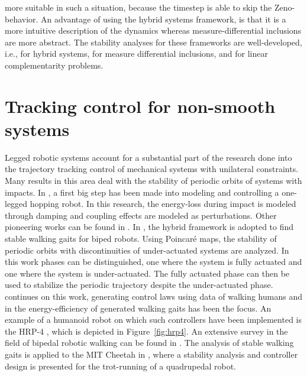 \documentclass[../DC2017114Bouma.tex]{subfiles}
\begin{document}
more suitable in such a situation, because the timestep is able to skip the Zeno-behavior. An advantage of using the hybrid systems framework, is that it is a more intuitive description of the dynamics whereas measure-differential inclusions are more abstract. The stability analyses for these frameworks are well-developed, i.e., \cite{Ye1998,Lygeros2003,Goebel2009} for hybrid systems, \cite{Pereira2004,Brogliato2004,Leine2008} for measure differential inclusions, and \cite{Brogliato1999,Camlibel2006,Camlibel2007} for linear complementarity problems.

\section{Tracking control for non-smooth systems}
Legged robotic systems account for a substantial part of the research done into the trajectory tracking control of mechanical systems with unilateral constraints. Many results in this area deal with the stability of periodic orbits of systems with impacts. In \cite{Raibert1984}, a first big step has been made into modeling and controlling a one-legged hopping robot. In this research, the energy-loss during impact is modeled through damping and coupling effects are modeled as perturbations. Other pioneering works can be found in \cite{Lebaudy1993,Michalska1996,Gregorio1997}. In \cite{Grizzle2001,Morris2009}, the hybrid framework is adopted to find stable walking gaits for biped robots. Using Poincar\'{e} maps, the stability of periodic orbits with discontinuities of under-actuated systems are analyzed. In this work phases can be distinguished, one where the system is fully actuated and one where the system is under-actuated. The fully actuated phase can then be used to stabilize the periodic trajectory despite the under-actuated phase. \cite{Ames2014} continues on this work, generating control laws using data of walking humans and in \cite{Reher2016} the energy-efficiency of generated walking gaits has been the focus. An example of a humanoid robot on which such controllers have been implemented is the HRP-4 \cite{HRP4}, which is depicted in Figure~\ref{fig:hrp4}. An extensive survey in the field of bipedal robotic walking can be found in \cite{Grizzle2014}. The analysis of stable walking gaits is applied to the MIT Cheetah in \cite{Hyun2014}, where a stability analysis and controller design is presented for the trot-running of a quadrupedal robot.  
\end{document}
